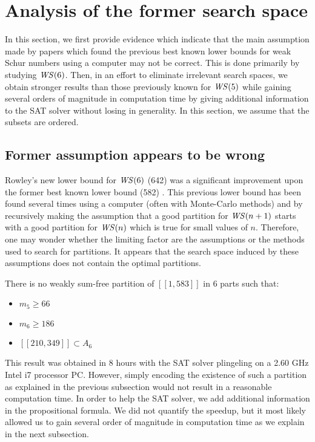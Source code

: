 \section{Analysis of the former search space}

\qquad \hypertarget{sat}{In} this section, we first provide evidence which indicate that the main assumption made by papers which
found the previous best known lower bounds for weak Schur numbers using a computer may not be correct. 
This is done primarily by studying \(\mathit{WS}(6)\). Then, in an effort to eliminate irrelevant search spaces, we 
obtain stronger results than those previously known for \(\mathit{WS} (5)\) while gaining several orders of magnitude 
in computation time by giving additional information to the SAT solver without losing in generality. In this 
section, we assume that the subsets are ordered.


\subsection{Former assumption appears to be wrong}

\qquad Rowley's new lower bound for \(\mathit{WS} (6)\) (642) \cite{RowleyWS} was a significant improvement upon
the former best known lower bound (582) \cite{EliahouBook}. This previous lower bound has been found 
several times using a computer (often with Monte-Carlo methods) and by recursively making the assumption 
that a good partition for \(\mathit{WS} (n+1)\) starts with a good partition for \(\mathit{WS} (n)\) which is true for small
values of \(n\). Therefore, one may wonder whether the limiting factor are the assumptions or the 
methods used to search for partitions. It appears that the search space induced by these assumptions does 
not contain the optimal partitions.

\begin{computational theorem}
There is no weakly sum-free partition of \([\![1,583]\!]\) in 6 parts such that:
\begin{itemize}
	\item \(m_5 \geqslant 66\)
	\item \(m_6 \geqslant 186\)
	\item \([\![210,349]\!] \subset A_6\)
\end{itemize}
\end{computational theorem}

This result was obtained in 8 hours with the SAT solver plingeling \cite{Lingeling2017} on a 2.60 GHz Intel
i7 processor PC.
However, simply encoding the existence of such a partition as explained in the previous subsection would not result in a
reasonable
computation time. In order to help the SAT solver, we add additional information in the propositional formula. We did
not quantify the
speedup, but it most likely allowed us to gain several order of magnitude in computation time as we explain in the next
subsection.

